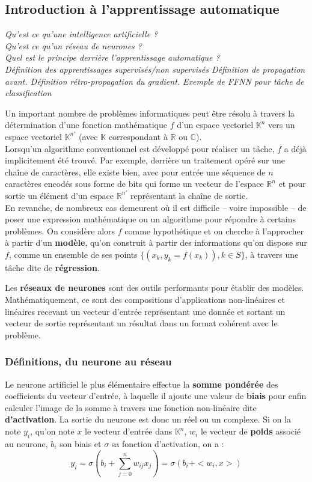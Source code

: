 \documentclass[12pt, french, twoside]{report}
\begin{document}
\subsection{Introduction à l'apprentissage automatique}
\textit{Qu'est ce qu'une intelligence artificielle ?\\
    Qu'est ce qu'un réseau de neurones ?\\
    Quel est le principe derrière l'apprentissage automatique ?\\
    Définition des apprentissages supervisés/non supervisés
    Définition de propagation avant.
    Définition rétro-propagation du gradient.
    Exemple de FFNN pour tâche de classification}

Un important nombre de problèmes informatiques peut être résolu à travers la détermination d'une fonction mathématique $f$ d'un espace vectoriel $\mathbb{K}^n$ vers un espace vectoriel $\mathbb{K}^{n'}$ (avec $\mathbb{K}$ correspondant à $\mathbb{R}$ ou $\mathbb{C}$).\\
Lorsqu'un algorithme conventionnel est développé pour réaliser un tâche, $f$ a déjà implicitement été trouvé. Par exemple, derrière un traitement opéré sur une chaîne de caractères, elle existe bien, avec pour entrée une séquence de $n$ caractères encodés sous forme de bits qui forme un vecteur de l'espace $\mathbb{R}^n$ et pour sortie un élément d'un espace $\mathbb{R}^{n'}$ représentant la chaîne de sortie.\\
En revanche, de nombreux cas demeurent où il est difficile -- voire impossible -- de poser une expression mathématique ou un algorithme pour répondre à certains problèmes. On considère alors $f$ comme hypothétique et on cherche à l'approcher à partir d'un \textbf{modèle}, qu'on construit à partir des informations qu'on dispose sur $f$, comme un ensemble de ses points $\{(x_k, y_k=f(x_k)), k \in S\}$, à travers une tâche dite de \textbf{régression}.

\vspace{12pt}
Les \textbf{réseaux de neurones} sont des outils performants pour établir des modèles. Mathématiquement, ce sont des compositions d'applications non-linéaires et linéaires recevant un vecteur d'entrée représentant une donnée et sortant un vecteur de sortie représentant un résultat dans un format cohérent avec le problème.

\subsubsection{Définitions, du neurone au réseau}
Le neurone artificiel le plus élémentaire effectue la \textbf{somme pondérée} des coefficients du vecteur d'entrée, à laquelle il ajoute une valeur de \textbf{biais} pour enfin calculer l'image de la somme à travers une fonction non-linéaire dite \textbf{d'activation}. La sortie du neurone est donc un réel ou un complexe. Si on la note $y_i$, qu'on note $x$ le vecteur d'entrée dans $\mathbb{K}^n$, $w_i$ le vecteur de \textbf{poids} associé au neurone, $b_i$ son biais et $\sigma$ sa fonction d'activation, on a :
\begin{equation}
    y_i = \sigma(b_i + \sum_{j=0}^{n} w_{ij}x_j) = \sigma(b_i + <w_i, x>)
\end{equation}\cite[section 1]{jurafsky_ffnn}
\end{document}
